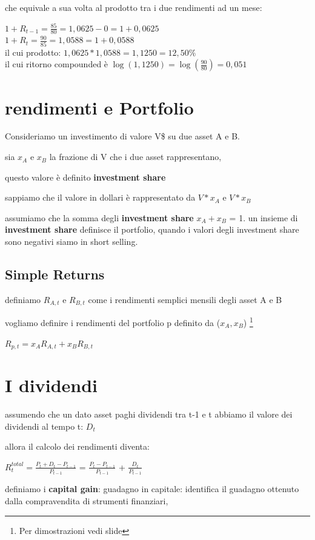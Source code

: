 \documentclass[a4paper,11pt]{report}
\begin{document}
{	che equivale a sua volta al prodotto tra i due rendimenti ad un mese:
	\begin{center}
	$1+R_{t-1}= {\frac {85}{80}}  =1,0625-0= 1+0,0625 $\\
	$1+R_t = {\frac {90}{85}}  =1,0588=1+ 0,0588 $ \\
	 il cui prodotto:  $1,0625*1,0588=1,1250 = 12,50\% $ \\
	il cui ritorno compounded è $\log{(1,1250)}= \log{({\frac{90}{80}})}=0,051$ \\
	\end{center}
\section{rendimenti e Portfolio}
	Consideriamo un investimento di valore V\$ su due asset A e B.

	sia $x_A$ e $x_B$ la frazione di V che i due asset rappresentano,

	questo valore è definito \textbf{investment share}

	sappiamo che il valore in dollari è rappresentato da $V*x_A$ e $V*x_B$

	assumiamo che la somma degli \textbf{investment share} $x_A + x_B$ = 1. \newline
	un insieme di \textbf{investment share} definisce il portfolio,
	quando i valori degli investment share sono negativi siamo in short selling.
\subsection{Simple Returns}
	definiamo $R_{A,t}$ e $R_{B,t}$ come i rendimenti semplici mensili degli asset A e B

	vogliamo definire i rendimenti del portfolio p definito da ($x_A,x_B$) \footnote{Per dimostrazioni vedi slide}

\begin{center}
	$R_{p,t} = x_A R_{A,t} + x_B R_{B,t}$
\end{center}
\section{I dividendi}
	assumendo che un dato asset paghi dividendi tra t-1 e t  abbiamo il valore dei dividendi al tempo t: $D_t$
	
	allora il calcolo dei rendimenti diventa:

\begin{center}
	$R_t^{total} = {\frac{P_t + D_t - P_{t-1}}{P_{t-1}}}$ = ${\frac {P_t - P_{t-1}}{P_{t-1}}}$
	 + ${\frac {D_t}{P_{t-1}}}$
\end{center}
 	definiamo i \textbf{capital gain}: guadagno in capitale: identifica il guadagno ottenuto dalla compravendita di strumenti finanziari,

}
\end{document}
